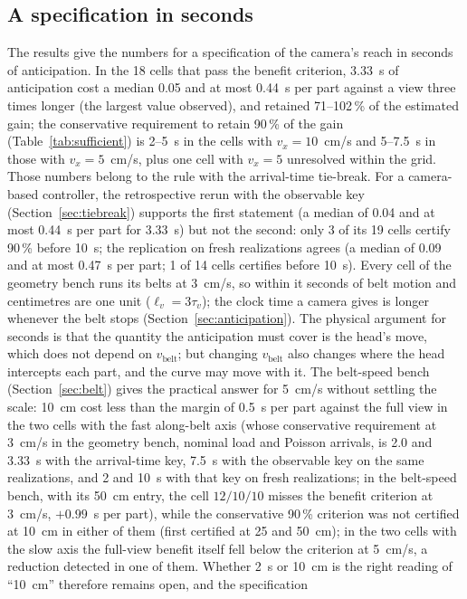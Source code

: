 \documentclass[11pt,a4paper]{article}
\newcommand{\tv}{\tau_{v}}
\newcommand{\lv}{\ell_{v}}
\newcommand{\vb}{v_{\mathrm{belt}}}
\begin{document}
\subsection{A specification in seconds}
The results give the numbers for a specification of the camera's reach in seconds of
anticipation. In the 18 cells that pass the benefit criterion, 3.33~s of anticipation cost
a median 0.05 and at most 0.44~s per part against a view three times longer (the largest
value observed), and retained 71--102\,\% of the estimated gain; the conservative
requirement to retain 90\,\% of the gain (Table~\ref{tab:sufficient}) is 2--5~s in the
cells with $v_x=10$~cm/s and 5--7.5~s in those with $v_x=5$~cm/s, plus one cell with
$v_x=5$ unresolved within the grid. Those numbers belong to the rule with the
arrival-time tie-break. For a camera-based controller, the retrospective rerun with the
observable key (Section~\ref{sec:tiebreak}) supports the first statement (a median of
0.04 and at most 0.44~s per part for 3.33~s) but not the second: only 3 of its 19 cells
certify 90\,\% before 10~s; the replication on fresh realizations agrees (a median of 0.09
and at most 0.47~s per part; 1 of 14 cells certifies before 10~s). Every cell of the geometry bench runs its belts at 3~cm/s, so
within it seconds of belt motion and centimetres are one unit ($\lv=3\tv$); the clock time a
camera gives is longer whenever the belt stops (Section~\ref{sec:anticipation}). The physical argument
for seconds is that the quantity the anticipation must cover is the head's move, which
does not depend on $\vb$; but changing $\vb$ also changes where the head intercepts each
part, and the curve may move with it. The belt-speed bench (Section~\ref{sec:belt}) gives
the practical answer for 5~cm/s without settling the scale: 10~cm cost less than the
margin of 0.5~s per part against the full view in the two cells with the fast along-belt
axis (whose conservative requirement at 3~cm/s in the geometry bench, nominal load and
Poisson arrivals, is 2.0 and 3.33~s with the arrival-time key, 7.5~s with the observable
key on the same realizations, and 2 and 10~s with that key on fresh realizations; in the
belt-speed bench, with its 50~cm entry, the cell $12/10/10$ misses the benefit
criterion at 3~cm/s, $+0.99$~s per part), while the conservative
90\,\% criterion was not certified at 10~cm in either of them (first certified at 25 and
50~cm); in the two cells with the
slow axis the full-view benefit itself fell below the criterion at 5~cm/s, a reduction
detected in one of them. Whether 2~s or
10~cm is the right reading of ``10~cm'' therefore remains open, and the specification
\end{document}
